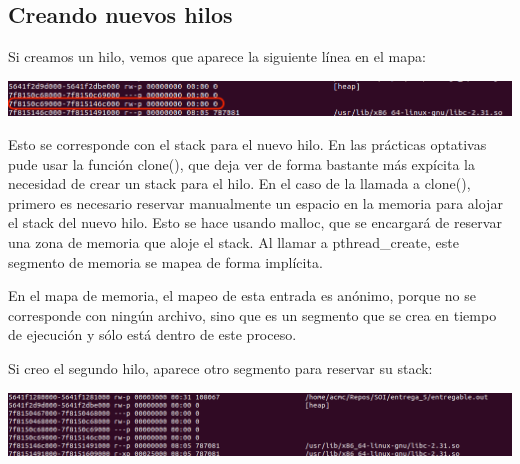 \documentclass[a4paper]{article}
\begin{document}
\subsection{Creando nuevos hilos}

Si creamos un hilo, vemos que aparece la siguiente línea en el mapa:

\includegraphics[scale=0.447]{6_hijo1.png}

Esto se corresponde con el stack para el nuevo hilo. En las prácticas optativas pude usar la función {\ttfamily clone()}, que deja ver de forma bastante más expícita la necesidad de crear un stack para el hilo. En el caso de la llamada a {\ttfamily clone()}, primero es necesario reservar manualmente un espacio en la memoria para alojar el stack del nuevo hilo. Esto se hace usando {\ttfamily malloc}, que se encargará de reservar una zona de memoria que aloje el stack. Al llamar a {\ttfamily pthread\_create}, este segmento de memoria se mapea de forma implícita.

En el mapa de memoria, el mapeo de esta entrada es anónimo, porque no se corresponde con ningún archivo, sino que es un segmento que se crea en tiempo de ejecución y sólo está dentro de este proceso.

Si creo el segundo hilo, aparece otro segmento para reservar su stack:

\includegraphics[scale=0.408]{6_hijo2.png}
\end{document}
